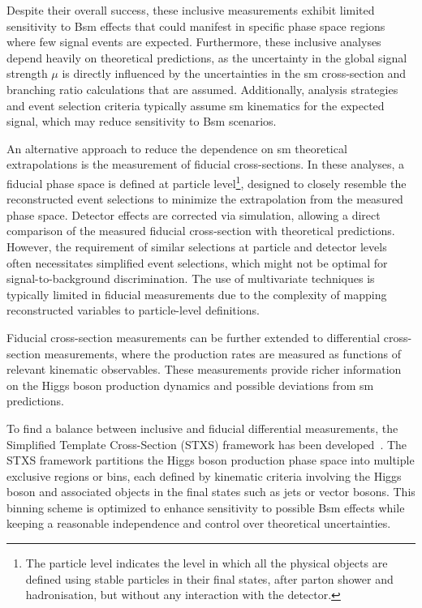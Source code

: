Despite their overall success, these inclusive measurements exhibit limited sensitivity to B\acrshort{sm} effects that could manifest in specific phase space regions where few signal events are expected. Furthermore, these inclusive analyses depend heavily on theoretical predictions, as the uncertainty in the global signal strength $\mu$ is directly influenced by the uncertainties in the \acrshort{sm} cross-section and branching ratio calculations that are assumed. Additionally, analysis strategies and event selection criteria typically assume \acrshort{sm} kinematics for the expected signal, which may reduce sensitivity to B\acrshort{sm} scenarios.

An alternative approach to reduce the dependence on \acrshort{sm} theoretical extrapolations is the measurement of fiducial cross-sections. In these analyses, a fiducial phase space is defined at particle level\footnote{The particle level indicates the level in which all the physical objects are defined using stable particles in their final states, after parton shower and hadronisation, but without any interaction with the detector.}, designed to closely resemble the reconstructed event selections to minimize the extrapolation from the measured phase space. Detector effects are corrected via simulation, allowing a direct comparison of the measured fiducial cross-section with theoretical predictions. However, the requirement of similar selections at particle and detector levels often necessitates simplified event selections, which might not be optimal for signal-to-background discrimination. The use of multivariate techniques is typically limited in fiducial measurements due to the complexity of mapping reconstructed variables to particle-level definitions.

Fiducial cross-section measurements can be further extended to differential cross-section measurements, where the production rates are measured as functions of relevant kinematic observables. These measurements provide richer information on the Higgs boson production dynamics and possible deviations from \acrshort{sm} predictions.

To find a balance between inclusive and fiducial differential measurements, the Simplified Template Cross-Section (STXS) framework has been developed~\cite{badger2016leshouches2015physics}. The STXS framework partitions the Higgs boson production phase space into multiple exclusive regions or bins, each defined by kinematic criteria involving the Higgs boson and associated objects in the final states such as jets or vector bosons. This binning scheme is optimized to enhance sensitivity to possible B\acrshort{sm} effects while keeping a reasonable independence and control over theoretical uncertainties.

